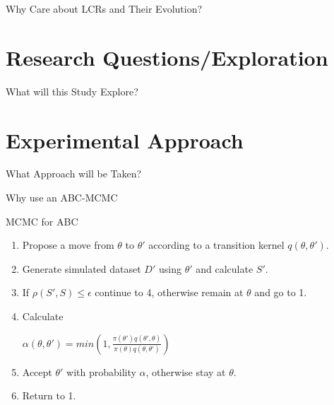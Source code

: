 \documentclass{beamer}
\begin{document}
	\begin{frame}{Why Care about LCRs and Their Evolution? }
	
	
	\end{frame}

	\section{Research Questions/Exploration}
	\begin{frame}{What will this Study Explore?}
		
		
	\end{frame}

	\section{Experimental Approach}
	\begin{frame}{What Approach will be Taken?}
	
	
	\end{frame}

	\begin{frame}{Why use an ABC-MCMC}
	
	
	\end{frame}

	\begin{frame}{MCMC for ABC}
		
		\begin{enumerate}
			\item Propose a move from $\theta$ to $\theta'$ according to a transition kernel $q(\theta,\theta')$.
			\item Generate simulated dataset $D'$ using $\theta'$ and calculate $S'$.
			\item If $\rho(S', S) \le \epsilon$ continue to 4, otherwise remain at $\theta$ and go to 1.
			\item Calculate \newline \begin{center}$\alpha(\theta, \theta') = min(1, \frac{\pi(\theta')q(\theta',\theta)}{\pi(\theta)q(\theta, \theta')})$ \end{center}
			\item Accept $\theta'$ with probability $\alpha$, otherwise stay at $\theta$.
			\item Return to 1.
		\end{enumerate}
	
	
	\end{frame}
\end{document}
